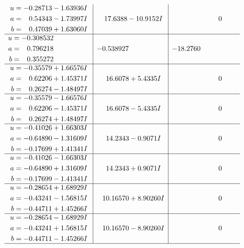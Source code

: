 \documentclass[1p]{elsarticle_modified}
\theoremstyle{definition}
\begin{document}
$$\begin{array}{c|c|c}
\begin{aligned}
u &= -0.28713 - 1.63936 I \\
a &= \phantom{-}0.54343 - 1.73997 I \\
b &= \phantom{-}0.47039 + 1.63060 I\end{aligned}
 & \phantom{-}17.6388 - 10.9152 I & \phantom{-0.000000 } 0 \\ \hline\begin{aligned}
u &= -0.308532\phantom{ +0.000000I} \\
a &= \phantom{-}0.796218\phantom{ +0.000000I} \\
b &= \phantom{-}0.355272\phantom{ +0.000000I}\end{aligned}
 & -0.538927\phantom{ +0.000000I} & -18.2760\phantom{ +0.000000I} \\ \hline\begin{aligned}
u &= -0.35579 + 1.66576 I \\
a &= \phantom{-}0.62206 + 1.45371 I \\
b &= \phantom{-}0.26274 - 1.48497 I\end{aligned}
 & \phantom{-}16.6078 + 5.4335 I & \phantom{-0.000000 } 0 \\ \hline\begin{aligned}
u &= -0.35579 - 1.66576 I \\
a &= \phantom{-}0.62206 - 1.45371 I \\
b &= \phantom{-}0.26274 + 1.48497 I\end{aligned}
 & \phantom{-}16.6078 - 5.4335 I & \phantom{-0.000000 } 0 \\ \hline\begin{aligned}
u &= -0.41026 + 1.66303 I \\
a &= -0.64890 - 1.31609 I \\
b &= -0.17699 + 1.41341 I\end{aligned}
 & \phantom{-}14.2343 - 0.9071 I & \phantom{-0.000000 } 0 \\ \hline\begin{aligned}
u &= -0.41026 - 1.66303 I \\
a &= -0.64890 + 1.31609 I \\
b &= -0.17699 - 1.41341 I\end{aligned}
 & \phantom{-}14.2343 + 0.9071 I & \phantom{-0.000000 } 0 \\ \hline\begin{aligned}
u &= -0.28654 + 1.68929 I \\
a &= -0.43241 - 1.56815 I \\
b &= -0.44711 + 1.45266 I\end{aligned}
 & \phantom{-}10.16570 + 8.90260 I & \phantom{-0.000000 } 0 \\ \hline\begin{aligned}
u &= -0.28654 - 1.68929 I \\
a &= -0.43241 + 1.56815 I \\
b &= -0.44711 - 1.45266 I\end{aligned}
 & \phantom{-}10.16570 - 8.90260 I & \phantom{-0.000000 } 0\\
 \hline 
 \end{array}$$\newpage\newpage\renewcommand{\arraystretch}{1}
\end{document}
